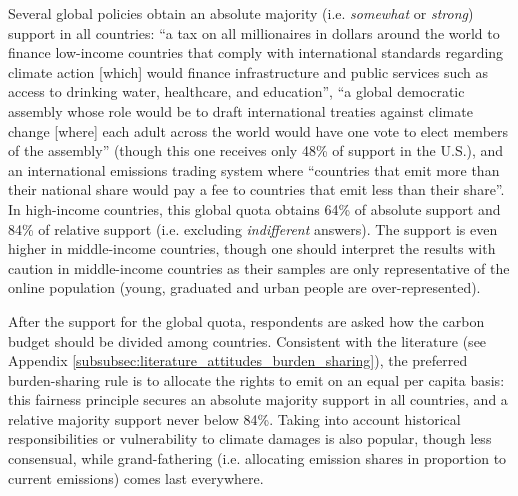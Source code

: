 Several global policies obtain an absolute majority (i.e. \textit{somewhat} or \textit{strong}) %
support in all countries: %
``a tax on all millionaires in dollars around the world to finance low-income countries that comply with international standards regarding climate action [which] would finance infrastructure and public services such as access to drinking water, healthcare, and education'', ``a global democratic assembly whose role would be to draft international treaties against climate change [where] each adult across the world would have one vote to elect members of the assembly'' (though this one receives only 48\% of support in the U.S.), %
and an international emissions trading system where ``countries that emit more than their national share would pay a fee to countries that emit less than their share''. 
In high-income countries, this global quota obtains 64\% of absolute %
support and 84\% of relative support (i.e. excluding \textit{indifferent} answers). The support is even higher in middle-income countries, though one should interpret the results with caution in middle-income countries as their samples are only representative of the online population (young, graduated and urban people are over-represented). 

After the support for the global quota, respondents are asked how the carbon budget should be divided among countries. 
Consistent with the literature (see Appendix \ref{subsubsec:literature_attitudes_burden_sharing}), the preferred burden-sharing rule is to allocate the rights to emit on an equal per capita basis: this fairness principle secures an absolute majority support in all countries, and a relative majority support never below 84\%. 
Taking into account historical responsibilities or vulnerability to climate damages is also popular, though less consensual, while grand-fathering (i.e. allocating emission shares in proportion to current emissions) comes last everywhere. 


